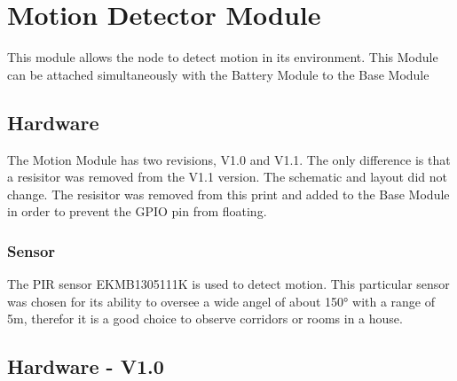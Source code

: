 \section{Motion Detector Module} 

    This module allows the node to detect motion in its environment. This Module can be 
    attached simultaneously with the Battery Module to the Base Module

    \subsection {Hardware}
        The Motion Module has two revisions, V1.0 and V1.1. The only difference is that 
        a resisitor was removed from the V1.1 version. The schematic and layout did not 
        change. The resisitor was removed from this print and added to the Base Module
        in order to prevent the GPIO pin from floating.
        
    \subsubsection{Sensor}
        The PIR sensor EKMB1305111K is used to detect motion. This particular sensor was chosen
        for its ability to oversee a wide angel of about 150° with a range of 5m, therefor it is
        a good choice to observe corridors or rooms in a house.

    \subsection {Hardware - V1.0}